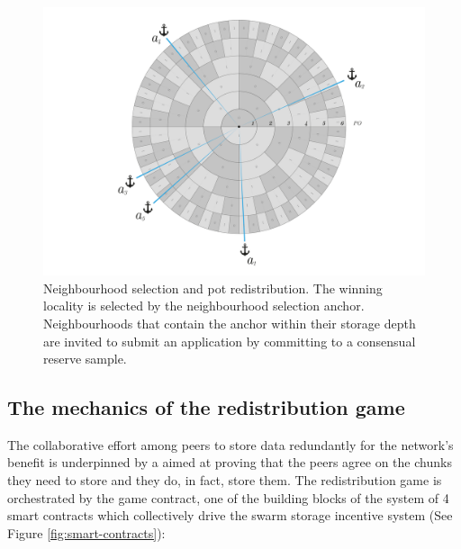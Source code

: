 \begin{figure}[!ht]
  \centering
    \includegraphics[width=\textwidth]{fig/nhd-selection.pdf}
  \caption[Neighbourhood selection and pot redistribution]{Neighbourhood selection and pot redistribution. The winning locality is selected by the neighbourhood selection anchor. Neighbourhoods that contain the anchor within their storage depth are invited to submit an application by committing to a consensual reserve sample. }
\label{fig:neighbourhood-selection}
\end{figure}    

    


\subsection{The mechanics of the redistribution game}\label{sec:mechanics}

The collaborative effort among peers to store data redundantly for the network's benefit is underpinned by a 
aimed at proving that the peers agree on the chunks they need to store and they do, in fact, store them. The redistribution game is orchestrated by the game contract, one of the building blocks of the system of 4 smart contracts which collectively drive the swarm storage incentive system (See Figure \ref{fig:smart-contracts}):

